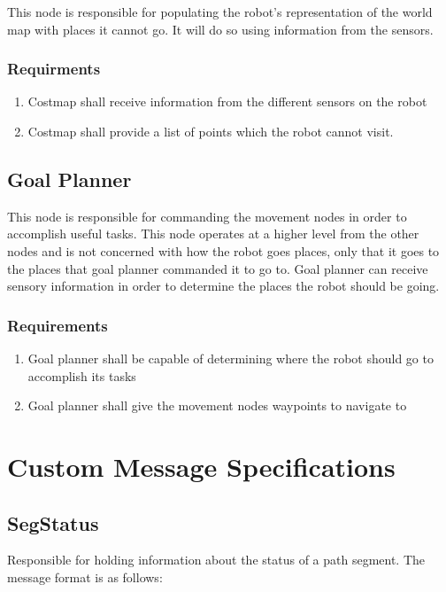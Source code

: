 This node is responsible for populating the robot's representation of the world map with places it cannot go. It will do so using information from the sensors.

  \subsubsection{Requirments}
  \begin{enumerate}
    \item Costmap shall receive information from the different sensors on the robot
    \item Costmap shall provide a list of points which the robot cannot visit.
  \end{enumerate}
       
\subsection{Goal Planner}

This node is responsible for commanding the movement nodes in order to accomplish useful tasks. This node operates at a higher level from the other nodes and is not concerned with how the robot goes places, only that it goes to the places that goal planner commanded it to go to. Goal planner can receive sensory information in order to determine the places the robot should be going.

  \subsubsection{Requirements}
  \begin{enumerate}
    \item Goal planner shall be capable of determining where the robot should go to accomplish its tasks
    \item Goal planner shall give the movement nodes waypoints to navigate to
  \end{enumerate}

\section{Custom Message Specifications}

\subsection{SegStatus}

Responsible for holding information about the status of a path
segment.  The message format is as follows:

